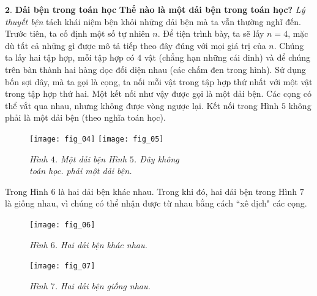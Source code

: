 \begin{multicols}{2}
\begin{tBox}
	\end{tBox}
	\vskip 0.1cm
	$\pmb{2.}$ \textbf{\color{duongvaotoanhoc}Dải bện trong toán học}
	\vskip 0.1cm
	\textbf{\color{duongvaotoanhoc}Thế nào là một dải bện trong toán học?}
	\vskip 0.1cm
	\textit{Lý thuyết bện} tách khái niệm bện khỏi những dải bện mà ta vẫn thường nghĩ đến. Trước tiên, ta cố định một số tự nhiên $n$. Để tiện trình bày, ta sẽ lấy $n = 4$, mặc dù tất cả những gì được mô tả tiếp theo đây đúng với mọi giá trị của $n$. Chúng ta lấy hai tập hợp, mỗi tập hợp có $4$ vật (chẳng hạn những cái đinh) và để chúng trên bàn thành hai hàng dọc đối diện nhau (các chấm đen trong hình). Sử dụng bốn sợi dây, mà ta gọi là cọng, ta nối mỗi vật trong tập hợp thứ nhất với một vật trong tập hợp thứ hai. Một kết nối như vậy được gọi là một dải bện. Các cọng có thể vắt qua nhau, nhưng không được vòng ngược lại. Kết nối trong Hình $5$ không phải là một dải bện (theo nghĩa toán học).
	\begin{figure}[H]
		\vspace*{-10pt}
		\centering
		\captionsetup{labelformat= empty, justification=centering}
		\texttt{[image: fig\_04]}\quad
		\texttt{[image: fig\_05]}
		\caption{\small\textit{\color{duongvaotoanhoc}Hình $4$. Một dải bện \hspace*{18pt} Hình $5$. Đây không \hspace*{10pt}\\
				\hspace*{20pt}toán học.\hspace*{45pt} phải một dải bện. }}
		\vspace*{-10pt}
	\end{figure}	
	Trong Hình $6$ là hai dải bện khác nhau. Trong khi đó, hai dải bện trong Hình $7$ là giống nhau, vì chúng có thể nhận được từ nhau bằng cách ``xê dịch" các cọng.
	\begin{figure}[H]
		\vspace*{-5pt}
		\centering
		\captionsetup{labelformat= empty, justification=centering}
		\texttt{[image: fig\_06]}
		\caption{\small\textit{\color{duongvaotoanhoc}Hình $6$. Hai dải bện khác nhau.}}
		\vspace*{-5pt}
	\end{figure}
	\begin{figure}[H]
		\vspace*{2pt}
		\centering
		\captionsetup{labelformat= empty, justification=centering}
		\texttt{[image: fig\_07]}
		\caption{\small\textit{\color{duongvaotoanhoc}Hình $7$. Hai dải bện giống nhau.}}
		\vspace*{-10pt}

\end{figure}
\end{multicols}
